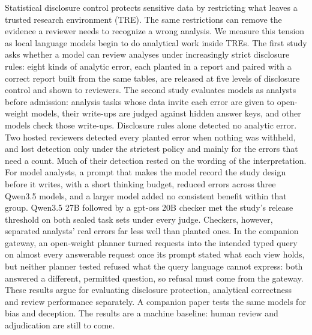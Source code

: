 Statistical disclosure control protects sensitive data by restricting what leaves a trusted research environment (TRE). The same restrictions can remove the evidence a reviewer needs to recognize a wrong analysis. We measure this tension as local language models begin to do analytical work inside TREs. The first study asks whether a model can review analyses under increasingly strict disclosure rules: eight kinds of analytic error, each planted in a report and paired with a correct report built from the same tables, are released at five levels of disclosure control and shown to reviewers. The second study evaluates models as analysts before admission:  analysis tasks whose data invite each error are given to open-weight models, their write-ups are judged against hidden answer keys, and other models check those write-ups. Disclosure rules alone detected no analytic error. Two hosted reviewers detected every planted error when nothing was withheld, and lost detection only under the strictest policy and mainly for the errors that need a count. Much of their detection rested on the wording of the interpretation. For model analysts, a prompt that makes the model record the study design before it writes, with a short thinking budget, reduced errors across three Qwen3.5 models, and a larger model added no consistent benefit within that group. Qwen3.5 27B followed by a gpt-oss 20B checker met the study's release threshold on both sealed task sets under every judge. Checkers, however, separated analysts' real errors far less well than planted ones. In the companion gateway, an open-weight planner turned requests into the intended typed query on almost every answerable request once its prompt stated what each view holds, but neither planner tested refused what the query language cannot express: both answered a different, permitted question, so refusal must come from the gateway. These results argue for evaluating disclosure protection, analytical correctness and review performance separately. A companion paper tests the same models for bias and deception. The results are a machine baseline: human review and adjudication are still to come.
